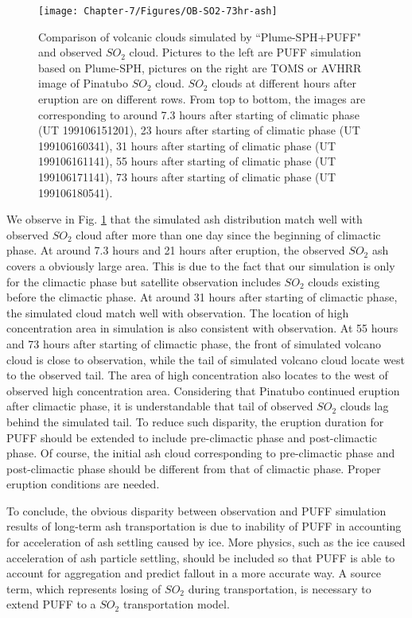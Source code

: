\begin{figure}[!htb]
\begin{minipage}{.325\textwidth}
    \end{minipage}%
    \begin{minipage}{.325 \textwidth}
        \centering
        \texttt{[image: Chapter-7/Figures/OB-SO2-73hr-ash]}
    \end{minipage}%
    \caption{Comparison of volcanic clouds simulated by ``Plume-SPH+PUFF" and observed $SO_2$ cloud. Pictures to the left are PUFF simulation based on Plume-SPH, pictures on the right are TOMS or AVHRR image of Pinatubo $SO_2$ cloud. $SO_2$ clouds at different hours after eruption are on different rows. From top to bottom, the images are corresponding to around 7.3 hours after starting of climatic phase (UT 199106151201), 23 hours after starting of climatic phase (UT 199106160341), 31 hours after starting of climatic phase (UT 199106161141), 55 hours after starting of climatic phase (UT 199106171141), 73 hours after starting of climatic phase (UT 199106180541).}
    \label{fig:Plume-SPH-Pinatubo-SO2-cloud}
\end{figure}

We observe in Fig. \ref{fig:Plume-SPH-Pinatubo-SO2-cloud} that the simulated ash distribution match well with observed $SO_2$ cloud after more than one day since the beginning of climactic phase. At around 7.3 hours and 21 hours after eruption, the observed $SO_2$ ash covers a obviously large area. This is due to the fact that our simulation is only for the climactic phase but satellite observation includes $SO_2$ clouds existing before the climactic phase. At around 31 hours after starting of climactic phase, the simulated cloud match well with observation. The location of high concentration area in simulation is also consistent with observation. At 55 hours and 73 hours after starting of climactic phase, the front of simulated volcano cloud is close to observation, while the tail of simulated volcano cloud locate west to the observed tail. The area of high concentration also locates to the west of observed high concentration area. Considering that Pinatubo continued eruption after climactic phase, it is understandable that tail of observed $SO_2$ clouds lag behind the simulated tail. To reduce such disparity, the eruption duration for PUFF should be extended to include pre-climactic phase and post-climactic phase. Of course, the initial ash cloud corresponding to pre-climactic phase and post-climactic phase should be different from that of climactic phase. Proper eruption conditions are needed.

To conclude, the obvious disparity between observation and PUFF simulation results of long-term ash transportation is due to inability of PUFF in accounting for acceleration of ash settling caused by ice. More physics, such as the ice caused acceleration of ash particle settling, should be included so that PUFF is able to account for aggregation and predict fallout in a more accurate way. A source term, which represents losing of $SO_2$ during transportation, is necessary to extend PUFF to a $SO_2$ transportation model.

